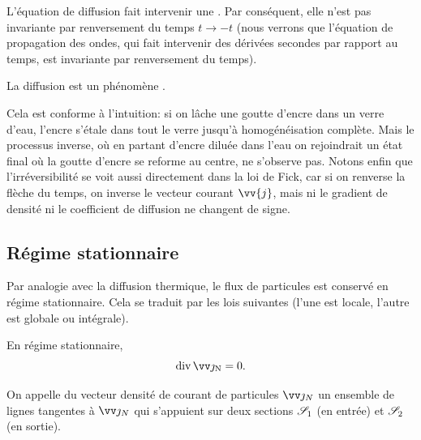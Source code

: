 \documentclass[12pt,fancy]{cours}
\begin{document}
L'équation de diffusion fait intervenir une . Par conséquent, elle n'est pas invariante par renversement du temps $t\rightarrow -t$ (nous verrons que l’équation de propagation des ondes, qui fait intervenir des dérivées secondes par rapport au temps, est invariante par renversement du temps).
\begin{prop}\label{prop:}
  La diffusion est un phénomène .
\end{prop}
 Cela est conforme à l'intuition: si on lâche une goutte d'encre dans un verre d'eau, l'encre s'étale dans tout le verre jusqu'à homogénéisation complète. Mais le processus inverse, où en partant d'encre diluée dans l'eau on rejoindrait un état final où la goutte d'encre se reforme au centre, ne s'observe pas.
Notons enfin que l'irréversibilité se voit aussi directement dans la loi de Fick, car si on renverse la flèche du temps, on inverse le vecteur courant $\vv{j}$, mais ni le gradient de densité ni le coefficient de diffusion ne changent de signe.

\subsection{Régime stationnaire}

Par analogie avec la diffusion thermique, le flux de particules est conservé en régime stationnaire. Cela se traduit par les lois suivantes (l’une est locale, l’autre est globale ou intégrale).


\begin{prop}\label{prop:conservj}
En régime stationnaire,
\begin{equation*}
\Dive{\Vec{{\jN}}}=0.
\end{equation*}
\end{prop}

 On appelle  du vecteur densité de courant de particules $\Vec{\jN}$ un ensemble de lignes tangentes à $\Vec{\jN}$ qui s'appuient sur deux sections $\S_1$ (en entrée) et $\S_2$ (en sortie).
\end{document}
